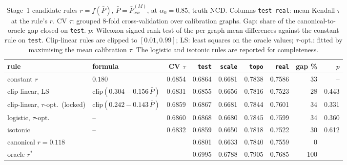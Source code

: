 \begin{table}[t]
\centering
\footnotesize
\caption{Stage~1 candidate rules $r=f(\bar P)$, $\bar P=\bar P^{(M)}_{\mathrm{esc}}$, at $\alpha_0=0.85$, truth NCD. Columns \texttt{test}--\texttt{real}: mean Kendall $\tau$ at the rule's $r$. CV $\tau$: grouped 8-fold cross-validation over calibration graphs. Gap: share of the canonical-to-oracle gap closed on \texttt{test}. $p$: Wilcoxon signed-rank test of the per-graph mean differences against the constant rule on \texttt{test}. Clip-linear rules are clipped to $[0.01,0.99]$; LS: least squares on the oracle values; $\tau$-opt.: fitted by maximising the mean calibration $\tau$. The logistic and isotonic rules are reported for completeness.}
\label{tab:stage1}
\begin{tabular}{@{}llrrrrrrr@{}}
\toprule
rule & formula & CV $\tau$ & \texttt{test} & \texttt{scale} & \texttt{topo} & \texttt{real} & gap \% & $p$ \\
\midrule
constant $r$ & $0.180$ & 0.6854 & 0.6864 & 0.6681 & 0.7838 & 0.7586 & 33 & -- \\
clip-linear, LS & $\mathrm{clip}(0.304-0.156\,\bar P)$ & 0.6831 & 0.6855 & 0.6656 & 0.7816 & 0.7523 & 28 & 0.443 \\
clip-linear, $\tau$-opt.\ (locked) & $\mathrm{clip}(0.242-0.143\,\bar P)$ & 0.6859 & 0.6867 & 0.6681 & 0.7844 & 0.7601 & 34 & 0.331 \\
logistic, $\tau$-opt. & -- & 0.6860 & 0.6868 & 0.6680 & 0.7845 & 0.7599 & 34 & 0.360 \\
isotonic & -- & 0.6832 & 0.6859 & 0.6650 & 0.7818 & 0.7522 & 30 & 0.612 \\
\midrule
canonical $r=0.118$ & & & 0.6801 & 0.6633 & 0.7840 & 0.7559 & 0 & \\
oracle $r^*$ & & & 0.6995 & 0.6788 & 0.7905 & 0.7685 & 100 & \\
\bottomrule
\end{tabular}
\end{table}
